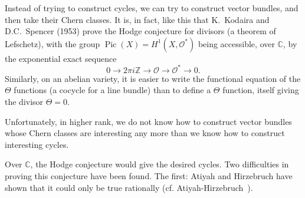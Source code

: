 \documentclass{article}
\theoremstyle{definition}
\newcommand{\sh}{\mathscr}
\newcommand{\ZZ}{\mathbb{Z}}
\newcommand{\CC}{\mathbb{C}}
\DeclareMathOperator{\Pic}{Pic}
\newcommand{\oldpage}[1]{\marginpar{\footnotesize$\Big\vert$ \textit{p.~#1}}}
\begin{document}
Instead of trying to construct cycles, we can try to construct vector bundles, and then take their Chern classes.
It is, in fact, like this that K.~Kodaira and D.C.~Spencer (1953) prove the Hodge conjecture for divisors (a theorem of Lefschetz), with the group $\Pic(X)=H^1(X,\sh{O}^*)$ being accessible, over $\CC$, by the exponential exact sequence
\[
  0 \to 2\pi i\ZZ \to \sh{O} \to \sh{O}^* \to 0.
\]
Similarly, on an abelian variety, it is easier to write the functional equation of the $\Theta$ functions (a cocycle for a line bundle) than to define a $\Theta$ function, itself giving the divisor $\Theta=0$.

\oldpage{144}
Unfortunately, in higher rank, we do not know how to construct vector bundles whose Chern classes are interesting any more than we know how to construct interesting cycles.

Over $\CC$, the Hodge conjecture would give the desired cycles.
Two difficulties in proving this conjecture have been found.
The first: Atiyah and Hirzebruch have shown that it could only be true rationally (cf. Atiyah-Hirzebruch~\cite{1}).
\end{document}

